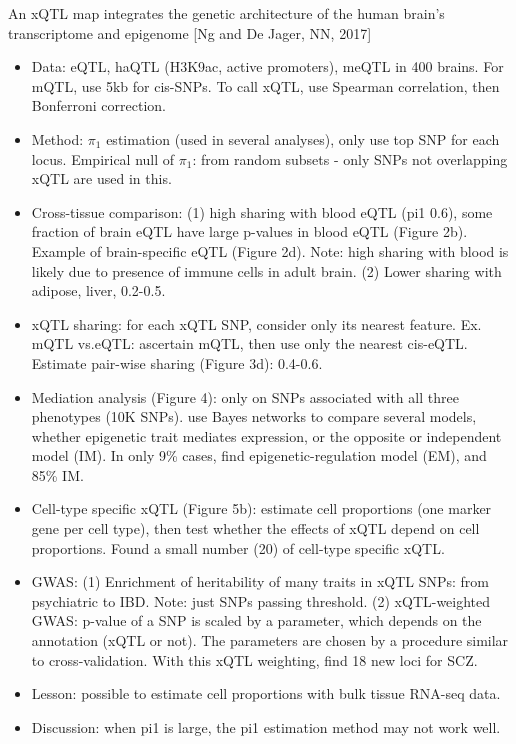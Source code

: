 \documentclass{report}
\begin{document}
An xQTL map integrates the genetic architecture of the human brain's transcriptome and epigenome [Ng and De Jager, NN, 2017]
\begin{itemize}
	\item Data: eQTL, haQTL (H3K9ac, active promoters), meQTL in 400 brains. For mQTL, use 5kb for cis-SNPs. To call xQTL, use Spearman correlation, then Bonferroni correction. 
	
	\item Method: $\pi_1$ estimation (used in several analyses), only use top SNP for each locus. Empirical null of $\pi_1$: from random subsets - only SNPs not overlapping xQTL are used in this. 
	
	\item Cross-tissue comparison: (1) high sharing with blood eQTL (pi1 0.6), some fraction of brain eQTL have large p-values in blood eQTL (Figure 2b). Example of brain-specific eQTL (Figure 2d). Note: high sharing with blood is likely due to presence of immune cells in adult brain. (2) Lower sharing with adipose, liver, 0.2-0.5. 
	
	\item xQTL sharing: for each xQTL SNP, consider only its nearest feature. Ex. mQTL vs.eQTL: ascertain mQTL, then use only the nearest cis-eQTL. Estimate pair-wise sharing (Figure 3d): 0.4-0.6. 
	
	\item Mediation analysis (Figure 4): only on SNPs associated with all three phenotypes (10K SNPs). use Bayes networks to compare several models, whether epigenetic trait mediates expression, or the opposite or independent model (IM). In only 9\% cases, find epigenetic-regulation model (EM), and 85\% IM.  
	
	\item Cell-type specific xQTL (Figure 5b): estimate cell proportions (one marker gene per cell type), then test whether the effects of xQTL depend on cell proportions. Found a small number (20) of cell-type specific xQTL. 
	
	\item GWAS: (1) Enrichment of heritability of many traits in xQTL SNPs: from psychiatric to IBD. Note: just SNPs passing threshold. (2) xQTL-weighted GWAS: p-value of a SNP is scaled by a parameter, which depends on the annotation (xQTL or not). The parameters are chosen by a procedure similar to cross-validation. With this xQTL weighting, find 18 new loci for SCZ.
	
	\item Lesson: possible to estimate cell proportions with bulk tissue RNA-seq data. 
	
	\item Discussion: when pi1 is large, the pi1 estimation method may not work well. 
\end{itemize}
\end{document}
